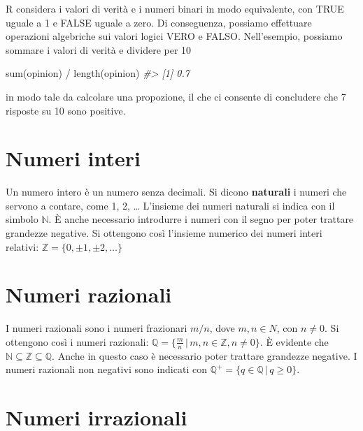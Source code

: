 \documentclass[
  11pt,
]{krantz}
\makeatletter
\newenvironment{Shaded}{\begin{snugshade}}{\end{snugshade}}
\newcommand{\CommentTok}[1]{\textcolor[rgb]{0.37,0.37,0.37}{\textit{#1}}}
\newcommand{\FunctionTok}[1]{\textcolor[rgb]{0,0,0}{#1}}
\newcommand{\NormalTok}[1]{#1}
\newcommand{\SpecialCharTok}[1]{\textcolor[rgb]{0,0,0}{#1}}
\newenvironment{kframe}{%
\medskip{}
\setlength{\fboxsep}{.8em}
 \def\at@end@of@kframe{}%
 \ifinner\ifhmode%
  \def\at@end@of@kframe{\end{minipage}}%
  \begin{minipage}{\columnwidth}%
 \fi\fi%
 \def\FrameCommand##1{\hskip\@totalleftmargin \hskip-\fboxsep
 \colorbox{shadecolor}{##1}\hskip-\fboxsep
     \hskip-\linewidth \hskip-\@totalleftmargin \hskip\columnwidth}%
 \MakeFramed {\advance\hsize-\width
   \@totalleftmargin\z@ \linewidth\hsize
   \@setminipage}}%
 {\par\unskip\endMakeFramed%
 \at@end@of@kframe}
\renewenvironment{Shaded}{\begin{kframe}}{\end{kframe}}
\theoremstyle{definition}
\theoremstyle{definition}
\theoremstyle{definition}
\theoremstyle{definition}
\theoremstyle{remark}
\makeatother
\begin{document}
R considera i valori di verità e i numeri binari in modo equivalente, con TRUE uguale a 1 e FALSE uguale a zero. Di conseguenza, possiamo effettuare operazioni algebriche sui valori logici VERO e FALSO. Nell'esempio, possiamo sommare i valori di verità e dividere per 10

\begin{Shaded}
\begin{Highlighting}[]
\FunctionTok{sum}\NormalTok{(opinion) }\SpecialCharTok{/} \FunctionTok{length}\NormalTok{(opinion)}
\CommentTok{\#\textgreater{} [1] 0.7}
\end{Highlighting}
\end{Shaded}

in modo tale da calcolare una propozione, il che ci consente di concludere che 7 risposte su 10 sono positive.

\hypertarget{numeri-interi}{%
\section{Numeri interi}\label{numeri-interi}}

Un numero intero è un numero senza decimali. Si dicono \textbf{naturali} i numeri che servono a contare, come 1, 2, \ldots{} L'insieme dei numeri naturali si indica con il simbolo \(\mathbb{N}\). È anche necessario introdurre i numeri con il segno per poter trattare grandezze negative. Si ottengono così l'insieme numerico dei numeri interi relativi: \(\mathbb{Z} = \{0, \pm 1, \pm 2, \dots \}\)

\hypertarget{numeri-razionali}{%
\section{Numeri razionali}\label{numeri-razionali}}

I numeri razionali sono i numeri frazionari \(m/n\), dove \(m, n \in N\), con \(n \neq 0\). Si ottengono così i numeri razionali: \(\mathbb{Q} = \{\frac{m}{n} \,\vert\, m, n \in \mathbb{Z}, n \neq 0\}\). È evidente che \(\mathbb{N} \subseteq \mathbb{Z} \subseteq \mathbb{Q}\). Anche in questo caso è necessario poter trattare grandezze negative. I numeri razionali non negativi sono indicati con \(\mathbb{Q^+} = \{q \in \mathbb{Q} \,\vert\, q \geq 0\}\).

\hypertarget{numeri-irrazionali}{%
\section{Numeri irrazionali}\label{numeri-irrazionali}}
\end{document}
